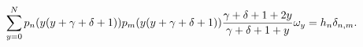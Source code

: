 \[\sum_{y=0}^{N}p_{n}(y(y+\gamma+\delta+1))p_{m}(y(y+\gamma+\delta+1))\*\frac{%
\gamma+\delta+1+2y}{\gamma+\delta+1+y}\omega_{y}=h_{n}\delta_{n,m}.\]